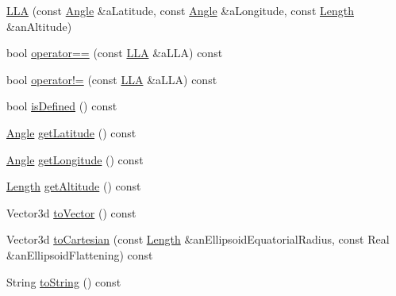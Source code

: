 \begin{DoxyCompactItemize}
\item 
\hyperlink{classostk_1_1physics_1_1coord_1_1spherical_1_1_l_l_a_a5a168b8087f0cfabca76b82870f6324a}{L\+LA} (const \hyperlink{classostk_1_1physics_1_1units_1_1_angle}{Angle} \&a\+Latitude, const \hyperlink{classostk_1_1physics_1_1units_1_1_angle}{Angle} \&a\+Longitude, const \hyperlink{classostk_1_1physics_1_1units_1_1_length}{Length} \&an\+Altitude)
\item 
bool \hyperlink{classostk_1_1physics_1_1coord_1_1spherical_1_1_l_l_a_addc7b917791049b8311821e56f5d29c9}{operator==} (const \hyperlink{classostk_1_1physics_1_1coord_1_1spherical_1_1_l_l_a}{L\+LA} \&a\+L\+LA) const
\item 
bool \hyperlink{classostk_1_1physics_1_1coord_1_1spherical_1_1_l_l_a_ae2568ab8a2969e0b5ecdb17592c71d53}{operator!=} (const \hyperlink{classostk_1_1physics_1_1coord_1_1spherical_1_1_l_l_a}{L\+LA} \&a\+L\+LA) const
\item 
bool \hyperlink{classostk_1_1physics_1_1coord_1_1spherical_1_1_l_l_a_a97649adf97bafbb9aa8cce36b30f920e}{is\+Defined} () const
\item 
\hyperlink{classostk_1_1physics_1_1units_1_1_angle}{Angle} \hyperlink{classostk_1_1physics_1_1coord_1_1spherical_1_1_l_l_a_a0b6d5f7409e1efbff0f01a9c00a876e8}{get\+Latitude} () const
\item 
\hyperlink{classostk_1_1physics_1_1units_1_1_angle}{Angle} \hyperlink{classostk_1_1physics_1_1coord_1_1spherical_1_1_l_l_a_aa031e4c4f1078cec374f0d4b0cc6e20d}{get\+Longitude} () const
\item 
\hyperlink{classostk_1_1physics_1_1units_1_1_length}{Length} \hyperlink{classostk_1_1physics_1_1coord_1_1spherical_1_1_l_l_a_a69214fc582c7d81ed8ddfbb28e7392a1}{get\+Altitude} () const
\item 
Vector3d \hyperlink{classostk_1_1physics_1_1coord_1_1spherical_1_1_l_l_a_add96410a645a57ddbe8d0d57c38885e0}{to\+Vector} () const
\item 
Vector3d \hyperlink{classostk_1_1physics_1_1coord_1_1spherical_1_1_l_l_a_a0bd2de41b2e1363414eb5bdc889d6a8e}{to\+Cartesian} (const \hyperlink{classostk_1_1physics_1_1units_1_1_length}{Length} \&an\+Ellipsoid\+Equatorial\+Radius, const Real \&an\+Ellipsoid\+Flattening) const
\item 
String \hyperlink{classostk_1_1physics_1_1coord_1_1spherical_1_1_l_l_a_adbab483b5d5a63fc507da0cd51db62ae}{to\+String} () const
\end{DoxyCompactItemize}
